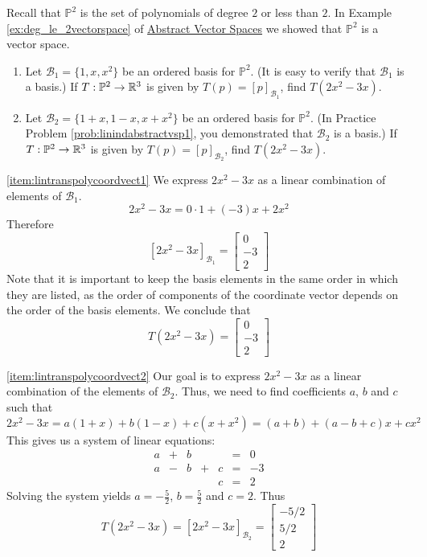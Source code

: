 \documentclass{ximera}
\begin{document}
\begin{example}\label{ex:abstvectsplintranspoly}
Recall that $\mathbb{P}^2$ is the set of polynomials of degree $2$ or less than $2$.  In Example \ref{ex:deg_le_2vectorspace} of \href{https://ximera.osu.edu/linearalgebradzv3/LinearAlgebraInteractiveIntro/VSP-0050/main}{Abstract Vector Spaces} we showed that $\mathbb{P}^2$ is a vector space. 
\begin{enumerate}
    \item \label{item:lintranspolycoordvect1} Let $\mathcal{B}_1=\{1, x, x^{2}\}$ be an ordered basis for $\mathbb{P}^2$.  (It is easy to verify that $\mathcal{B}_1$ is a basis.) If $T:\mathbb{P}^2\rightarrow \mathbb{R}^3$ is given by $T(p)=[p]_{\mathcal{B}_1}$, find $T(2x^2-3x)$.
    \item \label{item:lintranspolycoordvect2}
Let $\mathcal{B}_2=\{1 + x, 1 - x, x + x^{2}\}$ be an ordered basis for $\mathbb{P}^2$. (In Practice Problem \ref{prob:linindabstractvsp1}, you demonstrated that $\mathcal{B}_2$ is a basis.)  If $T:\mathbb{P}^2\rightarrow \mathbb{R}^3$ is given by $T(p)=[p]_{\mathcal{B}_2}$, find $T(2x^2-3x)$.
\end{enumerate}
\begin{explanation}
\ref{item:lintranspolycoordvect1}  We express $2x^2-3x$ as a linear combination of elements of $\mathcal{B}_1$.
$$2x^2-3x=0\cdot 1+ (-3)x+2x^2$$
Therefore $$[2x^2-3x]_{\mathcal{B}_1}=\begin{bmatrix}0\\-3\\2\end{bmatrix}$$
Note that it is important to keep the basis elements in the same order in which they are listed, as the order of components of the coordinate vector depends on the order of the basis elements.  We conclude that
$$T(2x^2-3x)=\begin{bmatrix}0\\-3\\2\end{bmatrix}$$

\ref{item:lintranspolycoordvect2} Our goal is to express $2x^2-3x$ as a linear combination of the elements of $\mathcal{B}_2$.  Thus, we need to find coefficients $a$, $b$ and $c$ such that
$$2x^2-3x=a(1+x)+b(1-x)+c(x+x^2)=(a+b)+(a-b+c)x+cx^2$$
This gives us a system of linear equations:
$$\begin{array}{ccccccc}
      a & +&b&&&= &0 \\
	 a& -&b&+&c&=&-3\\
     & &&&c&=&2
    \end{array}$$
    Solving the system yields $a=-\frac{5}{2}$, $b=\frac{5}{2}$ and $c=2$.  Thus
    $$T(2x^2-3x)=[2x^2-3x]_{\mathcal{B}_2}=\begin{bmatrix}-5/2\\5/2\\2\end{bmatrix}$$
\end{explanation}
\end{example}
\end{document}
